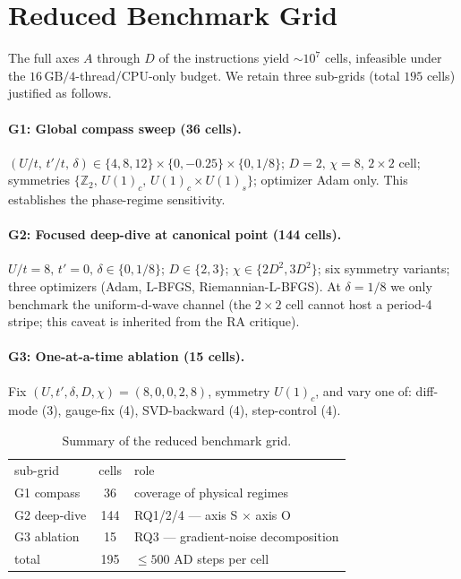 \documentclass[aps,prb,reprint,amsmath,amssymb,floatfix]{revtex4-2}
\newcommand{\Z}{\mathbb{Z}}
\begin{document}
\section{Reduced Benchmark Grid}
\label{sec:grid}

The full axes $A$ through $D$ of the instructions yield $\sim 10^7$ cells, infeasible under the $16\,\mathrm{GB}/4$-thread/CPU-only budget. We retain three sub-grids (total $195$ cells) justified as follows.

\paragraph{G1: Global compass sweep (36 cells).}
$(U/t,\,t'/t,\,\delta)\in\{4,8,12\}\times\{0,-0.25\}\times\{0,1/8\}$;
$D=2,\,\chi=8$, $2\times 2$ cell; symmetries $\{\Z_2,\,U(1)_c,\,U(1)_c\!\times\! U(1)_s\}$; optimizer Adam only. This establishes the phase-regime sensitivity.

\paragraph{G2: Focused deep-dive at canonical point (144 cells).}
$U/t=8,\,t'=0,\,\delta\in\{0,1/8\}$; $D\in\{2,3\}$; $\chi\in\{2D^2,3D^2\}$; six symmetry variants; three optimizers (Adam, L-BFGS, Riemannian-L-BFGS). At $\delta=1/8$ we only benchmark the uniform-d-wave channel (the $2\times 2$ cell cannot host a period-4 stripe; this caveat is inherited from the RA critique).

\paragraph{G3: One-at-a-time ablation (15 cells).}
Fix $(U,t',\delta,D,\chi)=(8,0,0,2,8)$, symmetry $U(1)_c$, and vary one of: diff-mode (3), gauge-fix (4), SVD-backward (4), step-control (4).

\begin{table}[ht]
\caption{Summary of the reduced benchmark grid.}
\label{tab:grid}
\begin{ruledtabular}
\begin{tabular}{lcl}
sub-grid & cells & role \\
\colrule
G1 compass   & 36 & coverage of physical regimes \\
G2 deep-dive & 144 & RQ1/2/4 — axis S $\times$ axis O \\
G3 ablation  & 15 & RQ3 — gradient-noise decomposition \\
total        & 195 & $\leq 500$ AD steps per cell \\
\end{tabular}
\end{ruledtabular}
\end{table}
\end{document}
